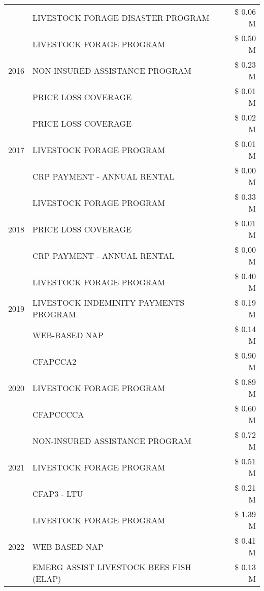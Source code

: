 \begin{tabular}{llr}
 & LIVESTOCK FORAGE DISASTER PROGRAM & \$ 0.06 M \\
\cline{1-3}
\multirow[t]{3}{*}{2016} & LIVESTOCK FORAGE PROGRAM & \$ 0.50 M \\
 & NON-INSURED ASSISTANCE PROGRAM & \$ 0.23 M \\
 & PRICE LOSS COVERAGE & \$ 0.01 M \\
\cline{1-3}
\multirow[t]{3}{*}{2017} & PRICE LOSS COVERAGE & \$ 0.02 M \\
 & LIVESTOCK FORAGE PROGRAM & \$ 0.01 M \\
 & CRP PAYMENT - ANNUAL RENTAL & \$ 0.00 M \\
\cline{1-3}
\multirow[t]{3}{*}{2018} & LIVESTOCK FORAGE PROGRAM & \$ 0.33 M \\
 & PRICE LOSS COVERAGE & \$ 0.01 M \\
 & CRP PAYMENT - ANNUAL RENTAL & \$ 0.00 M \\
\cline{1-3}
\multirow[t]{3}{*}{2019} & LIVESTOCK FORAGE PROGRAM & \$ 0.40 M \\
 & LIVESTOCK INDEMINITY PAYMENTS PROGRAM & \$ 0.19 M \\
 & WEB-BASED NAP & \$ 0.14 M \\
\cline{1-3}
\multirow[t]{3}{*}{2020} & CFAPCCA2 & \$ 0.90 M \\
 & LIVESTOCK FORAGE PROGRAM & \$ 0.89 M \\
 & CFAPCCCCA & \$ 0.60 M \\
\cline{1-3}
\multirow[t]{3}{*}{2021} & NON-INSURED ASSISTANCE PROGRAM & \$ 0.72 M \\
 & LIVESTOCK FORAGE PROGRAM & \$ 0.51 M \\
 & CFAP3 - LTU & \$ 0.21 M \\
\cline{1-3}
\multirow[t]{3}{*}{2022} & LIVESTOCK FORAGE PROGRAM & \$ 1.39 M \\
 & WEB-BASED NAP & \$ 0.41 M \\
 & EMERG ASSIST LIVESTOCK BEES FISH (ELAP) & \$ 0.13 M \\
\cline{1-3}
\bottomrule
\end{tabular}
